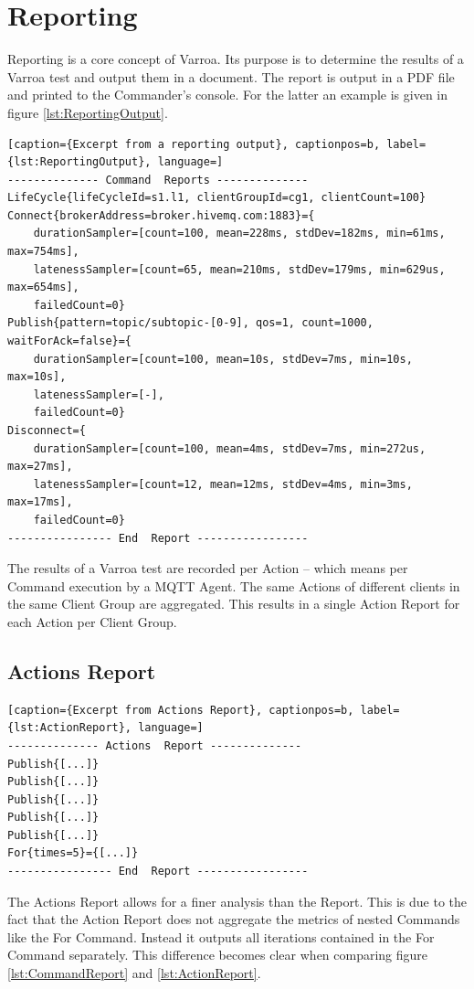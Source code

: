 \chapter{Reporting}\label{sec:Reporting}
Reporting is a core concept of Varroa.
Its purpose is to determine the results of a Varroa test and output them in a document.
The report is output in a PDF file and printed to the Commander's console.
For the latter an example is given in figure \ref{lst:ReportingOutput}.
\\
\begin{lstlisting}[caption={Excerpt from a reporting output}, captionpos=b, label={lst:ReportingOutput}, language=]
-------------- Command  Reports --------------
LifeCycle{lifeCycleId=s1.l1, clientGroupId=cg1, clientCount=100}
Connect{brokerAddress=broker.hivemq.com:1883}={
	durationSampler=[count=100, mean=228ms, stdDev=182ms, min=61ms, max=754ms],
	latenessSampler=[count=65, mean=210ms, stdDev=179ms, min=629us, max=654ms],
	failedCount=0}
Publish{pattern=topic/subtopic-[0-9], qos=1, count=1000, waitForAck=false}={
	durationSampler=[count=100, mean=10s, stdDev=7ms, min=10s, max=10s],
	latenessSampler=[-],
	failedCount=0}
Disconnect={
	durationSampler=[count=100, mean=4ms, stdDev=7ms, min=272us, max=27ms],
	latenessSampler=[count=12, mean=12ms, stdDev=4ms, min=3ms, max=17ms],
	failedCount=0}
---------------- End  Report -----------------
\end{lstlisting}

The results of a Varroa test are recorded per Action -- which means per Command execution by a MQTT Agent.
The same Actions of different clients in the same Client Group are aggregated.
This results in a single Action Report for each Action per Client Group.

\section{Actions Report}
\begin{lstlisting}[caption={Excerpt from Actions Report}, captionpos=b, label={lst:ActionReport}, language=]
-------------- Actions  Report --------------
Publish{[...]}
Publish{[...]}
Publish{[...]}
Publish{[...]}
Publish{[...]}
For{times=5}={[...]}
---------------- End  Report -----------------
\end{lstlisting}
The Actions Report allows for a finer analysis than the Report.
This is due to the fact that the Action Report does not aggregate the metrics of nested Commands like the For Command.
Instead it outputs all iterations contained in the For Command separately.
This difference becomes clear when comparing figure \ref{lst:CommandReport} and \ref{lst:ActionReport}.

